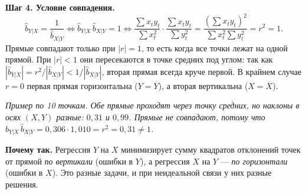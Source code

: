 \begin{solution}
\medskip
\textbf{Шаг 4. Условие совпадения.}
\[
  \widehat{b}_{Y|X} = \frac{1}{\widehat{b}_{X|Y}}
  \iff
  \widehat{b}_{Y|X}\,\widehat{b}_{X|Y} = 1
  \iff
  \frac{\sum x_ty_t}{\sum x_t^2}\cdot\frac{\sum x_ty_t}{\sum y_t^2}
  = \frac{(\sum x_ty_t)^2}{\sum x_t^2\sum y_t^2} = r^2 = 1 .
\]
Прямые совпадают только при $|r| = 1$, то есть когда все точки лежат на одной
прямой. При $|r| < 1$ они пересекаются в точке средних под углом: так как
$|\widehat{b}_{Y|X}| = r^2/|\widehat{b}_{X|Y}| < 1/|\widehat{b}_{X|Y}|$,
вторая прямая всегда круче первой. В крайнем случае $r = 0$ первая прямая
горизонтальна ($Y = \overline{Y}$), а вторая вертикальна ($X = \overline{X}$).

\begin{center}

\smallskip
{\small\itshape Пример по 10 точкам. Обе прямые проходят через точку средних,
но наклоны в осях $(X, Y)$ разные: $0{,}31$ и $0{,}99$. Прямые не совпадают,
потому что $\widehat{b}_{Y|X}\,\widehat{b}_{X|Y} = 0{,}306\cdot 1{,}010 = r^2 = 0{,}31 \ne 1$.\par}
\end{center}

\textbf{Почему так.} Регрессия $Y$ на $X$ минимизирует сумму квадратов
отклонений точек от прямой \emph{по вертикали} (ошибки в $Y$), а регрессия $X$
на $Y$ — \emph{по горизонтали} (ошибки в $X$). Это разные задачи, и при
неидеальной связи у них разные решения.
\end{solution}

